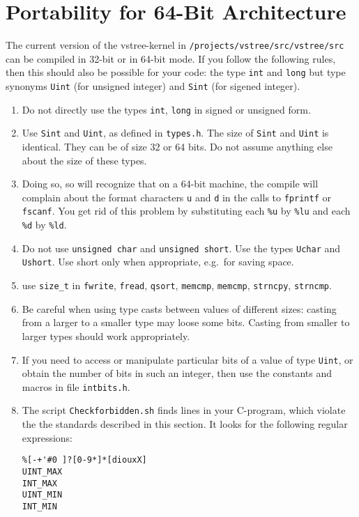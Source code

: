 \documentclass[12pt]{article}
\begin{document}
\section{Portability for 64-Bit Architecture}\label{SixtyfourBits}
The current version of the vstree-kernel in 
\texttt{/projects/vstree/src/vstree/src} can be compiled in 32-bit or in 
64-bit mode. If you follow the following rules, then this should also
be possible for your code:
the type \texttt{int} and \texttt{long} but type synonyms 
\texttt{Uint} (for unsigned integer) and \texttt{Sint}
(for sigened integer).
\begin{enumerate}
\item
Do not directly use the types \texttt{int}, \texttt{long} in signed or
unsigned form.
\item
Use \texttt{Sint} and \texttt{Uint}, as defined in 
\texttt{types.h}. The size of \texttt{Sint} and \texttt{Uint} is identical.
They can be of size 32 or 64 bits. Do not assume anything else about the 
size of these types. 
\item
Doing so, so will recognize that on a 64-bit machine,
the compile will complain about
the format characters \texttt{u} and \texttt{d} in the calls to 
\texttt{fprintf} or \texttt{fscanf}. You get rid of this problem
by substituting each \texttt{\%u} by \texttt{\%lu} and each 
\texttt{\%d} by \texttt{\%ld}.
\item
Do not use \texttt{unsigned char} and \texttt{unsigned short}. Use the
types \texttt{Uchar} and \texttt{Ushort}. Use short only when appropriate, 
e.g.\ for saving space.
\item
use \texttt{size\_t} in \texttt{fwrite}, \texttt{fread}, \texttt{qsort},
\texttt{memcmp}, \texttt{memcmp}, \texttt{strncpy}, \texttt{strncmp}.
\item
Be careful when using type casts between values of different sizes:
casting from a larger to a smaller type may loose some bits.
Casting from smaller to larger types should work appropriately.
\item
If you need to access or manipulate particular bits of a value of type
\texttt{Uint}, or obtain the number of bits in such an
integer, then use the constants and macros
in file \texttt{intbits.h}.
\item
The script \texttt{Checkforbidden.sh} finds lines in your 
C-program, which violate the the standards described in this section.
It looks for the following regular expressions:
\begin{verbatim}
%[-+'#0 ]?[0-9*]*[diouxX]
UINT_MAX
INT_MAX
UINT_MIN
INT_MIN
\end{verbatim}
\end{enumerate}
\end{document}
